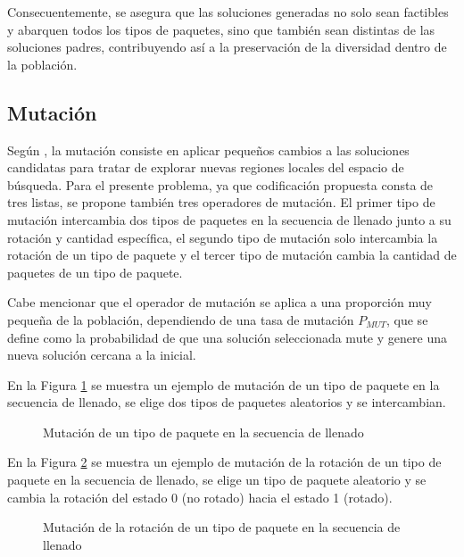 \documentclass[openany]{article}
\begin{document}
Consecuentemente, se asegura que las soluciones generadas no solo sean factibles y abarquen todos los tipos de paquetes, sino que también sean distintas de las soluciones padres, contribuyendo así a la preservación de la diversidad dentro de la población.

\subsection{Mutación}

Según \textcite{Dockhorn2022}, la mutación consiste en aplicar pequeños cambios a las soluciones candidatas para tratar de explorar nuevas regiones locales del espacio de búsqueda. Para el presente problema, ya que codificación propuesta consta de tres listas, se propone también tres operadores de mutación. El primer tipo de mutación intercambia dos tipos de paquetes en la secuencia de llenado junto a su rotación y cantidad específica, el segundo tipo de mutación solo intercambia la rotación de un tipo de paquete y el tercer tipo de mutación cambia la cantidad de paquetes de un tipo de paquete.

Cabe mencionar que el operador de mutación se aplica a una proporción muy pequeña de la población, dependiendo de una tasa de mutación $P_{MUT}$, que se define como la probabilidad de que una solución seleccionada mute y genere una nueva solución cercana a la inicial.

En la Figura \ref{fig:mutacion_tipo} se muestra un ejemplo de mutación de un tipo de paquete en la secuencia de llenado, se elige dos tipos de paquetes aleatorios y se intercambian.

\begin{figure}[H]
    \centering
    
    \caption{Mutación de un tipo de paquete en la secuencia de llenado}
    \label{fig:mutacion_tipo}
\end{figure}

En la Figura \ref{fig:mutacion_rotacion} se muestra un ejemplo de mutación de la rotación de un tipo de paquete en la secuencia de llenado, se elige un tipo de paquete aleatorio y se cambia la rotación del estado 0 (no rotado) hacia el estado 1 (rotado).

\begin{figure}[H]
    \centering
    
    \caption{Mutación de la rotación de un tipo de paquete en la secuencia de llenado}
    \label{fig:mutacion_rotacion}
\end{figure}
\end{document}
